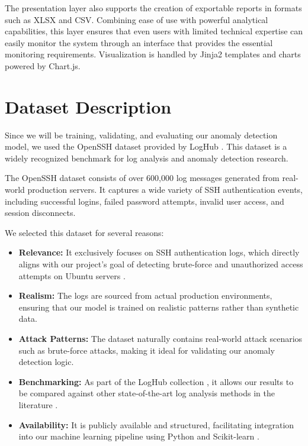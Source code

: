 \documentclass[12pt,a4paper]{report} %
\begin{document}
The presentation layer also supports the creation of exportable reports in formats such as XLSX and CSV. Combining ease of use with powerful analytical capabilities, this layer ensures that even users with limited technical expertise can easily monitor the system through an interface that provides the essential monitoring requirements. Visualization is handled by Jinja2 templates \cite{Jinja2023} and charts powered by Chart.js.

\section{Dataset Description}
Since we will be training, validating, and evaluating our anomaly detection model, we used the OpenSSH dataset provided by LogHub \cite{OpenSSHLoghub}. This dataset is a widely recognized benchmark for log analysis and anomaly detection research.

The OpenSSH dataset consists of over 600,000 log messages generated from real-world production servers. It captures a wide variety of SSH authentication events, including successful logins, failed password attempts, invalid user access, and session disconnects.

We selected this dataset for several reasons:

\begin{itemize}
	\item \textbf{Relevance:} It exclusively focuses on SSH authentication logs, which directly aligns with our project's goal of detecting brute-force and unauthorized access attempts on Ubuntu servers \cite{Ubuntu2022}.
	
	\item \textbf{Realism:} The logs are sourced from actual production environments, ensuring that our model is trained on realistic patterns rather than synthetic data.
	
	\item \textbf{Attack Patterns:} The dataset naturally contains real-world attack scenarios such as brute-force attacks, making it ideal for validating our anomaly detection logic.
	
	\item \textbf{Benchmarking:} As part of the LogHub collection \cite{OpenSSHLoghub}, it allows our results to be compared against other state-of-the-art log analysis methods in the literature \cite{Guo2021, He2016}.
	
	\item \textbf{Availability:} It is publicly available and structured, facilitating integration into our machine learning pipeline using Python \cite{Python311} and Scikit-learn \cite{ScikitLearn2023}.
\end{itemize}
\end{document}
